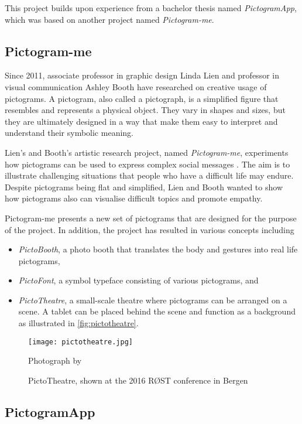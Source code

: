 This project builds upon experience from a bachelor thesis named \emph{PictogramApp}, which was based on another project named \emph{Pictogram-me}.

\subsection{Pictogram-me}

Since 2011, associate professor in graphic design Linda Lien and professor in visual communication Ashley Booth have researched on creative usage of pictograms. A pictogram, also called a pictograph, is a simplified figure that resembles and represents a physical object. They vary in shapes and sizes, but they are ultimately designed in a way that make them easy to interpret and understand their symbolic meaning.

Lien's and Booth's artistic research project, named \emph{Pictogram-me}, experiments how pictograms can be used to express complex social messages \autocite{lien2018}. The aim is to illustrate challenging situations that people who have a difficult life may endure. Despite pictograms being flat and simplified, Lien and Booth wanted to show how pictograms also can visualise difficult topics and promote empathy.

Pictogram-me presents a new set of pictograms that are designed for the purpose of the project. In addition, the project has resulted in various concepts including

\begin{itemize}
    \item \emph{PictoBooth}, a photo booth that translates the body and gestures into real life pictograms,
    \item \emph{PictoFont}, a symbol typeface consisting of various pictograms, and
    \item \emph{PictoTheatre}, a small-scale theatre where pictograms can be arranged on a scene. A tablet can be placed behind the scene and function as a background as illustrated in \autoref{fig:pictotheatre}.
\end{itemize}

\begin{figure}
    \centering
    \texttt{[image: pictotheatre.jpg]}
    \caption{PictoTheatre, shown at the 2016 RØST conference in Bergen}
    Photograph by \textcite{lien2018}
    \label{fig:pictotheatre}
\end{figure}

\subsection{PictogramApp}

